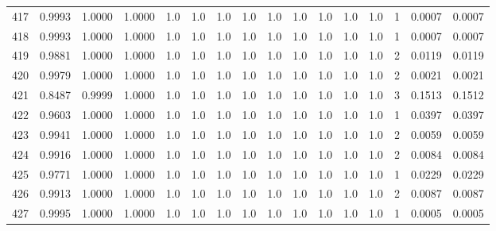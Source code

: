 \begin{tabular}{lrrrrrrrrrrrrrrr}
417 &      0.9993 &  1.0000 &  1.0000 &     1.0 &     1.0 &     1.0 &     1.0 &     1.0 &     1.0 &     1.0 &      1.0 &        1.0 &      1 &                    0.0007 &                     0.0007 \\
418 &      0.9993 &  1.0000 &  1.0000 &     1.0 &     1.0 &     1.0 &     1.0 &     1.0 &     1.0 &     1.0 &      1.0 &        1.0 &      1 &                    0.0007 &                     0.0007 \\
419 &      0.9881 &  1.0000 &  1.0000 &     1.0 &     1.0 &     1.0 &     1.0 &     1.0 &     1.0 &     1.0 &      1.0 &        1.0 &      2 &                    0.0119 &                     0.0119 \\
420 &      0.9979 &  1.0000 &  1.0000 &     1.0 &     1.0 &     1.0 &     1.0 &     1.0 &     1.0 &     1.0 &      1.0 &        1.0 &      2 &                    0.0021 &                     0.0021 \\
421 &      0.8487 &  0.9999 &  1.0000 &     1.0 &     1.0 &     1.0 &     1.0 &     1.0 &     1.0 &     1.0 &      1.0 &        1.0 &      3 &                    0.1513 &                     0.1512 \\
422 &      0.9603 &  1.0000 &  1.0000 &     1.0 &     1.0 &     1.0 &     1.0 &     1.0 &     1.0 &     1.0 &      1.0 &        1.0 &      1 &                    0.0397 &                     0.0397 \\
423 &      0.9941 &  1.0000 &  1.0000 &     1.0 &     1.0 &     1.0 &     1.0 &     1.0 &     1.0 &     1.0 &      1.0 &        1.0 &      2 &                    0.0059 &                     0.0059 \\
424 &      0.9916 &  1.0000 &  1.0000 &     1.0 &     1.0 &     1.0 &     1.0 &     1.0 &     1.0 &     1.0 &      1.0 &        1.0 &      2 &                    0.0084 &                     0.0084 \\
425 &      0.9771 &  1.0000 &  1.0000 &     1.0 &     1.0 &     1.0 &     1.0 &     1.0 &     1.0 &     1.0 &      1.0 &        1.0 &      1 &                    0.0229 &                     0.0229 \\
426 &      0.9913 &  1.0000 &  1.0000 &     1.0 &     1.0 &     1.0 &     1.0 &     1.0 &     1.0 &     1.0 &      1.0 &        1.0 &      2 &                    0.0087 &                     0.0087 \\
427 &      0.9995 &  1.0000 &  1.0000 &     1.0 &     1.0 &     1.0 &     1.0 &     1.0 &     1.0 &     1.0 &      1.0 &        1.0 &      1 &                    0.0005 &                     0.0005 \\

\end{tabular}
